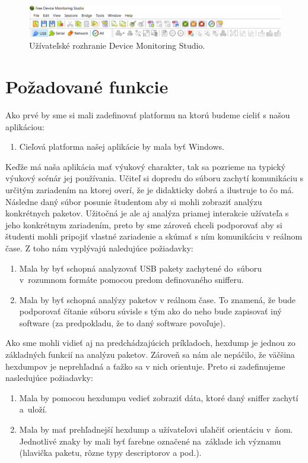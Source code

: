 \begin{figure}[!htb]
	\centering
	\includegraphics[width=\textwidth]{img/uvod_hhd_interface}
	\caption{Užívateľské rozhranie Device Monitoring Studio.}
	\label{obr:uvod:hhd_interface}
\end{figure}


\section{Požadované funkcie}

Ako prvé by sme si mali zadefinovať platformu na ktorú budeme cieliť s našou aplikáciou:
\begin{enumerate}[label=\textbf{P\arabic*}]
	\item \label{uvod:poz:platforma} Cieľová platforma našej aplikácie by mala byť Windows. 
\end{enumerate}

Keďže má naša aplikácia mať výukový charakter, tak sa pozrieme na typický výukový scénár jej používania. Učiteľ si dopredu do súboru zachytí komunikáciu s určitým zariadením na ktorej overí, že je didakticky dobrá a ilustruje to čo má. Následne daný súbor posunie študentom aby si mohli zobraziť analýzu konkrétnych paketov. Užitočná je ale aj analýza priamej interakcie užívateľa s jeho konkrétnym zariadením, preto by sme zároveň chceli podporovať aby si študenti mohli pripojiť vlastné zariadenie a skúmať s ním komunikáciu v reálnom čase. Z toho nám vyplývajú naledujúce požiadavky:
\begin{enumerate}[label=\textbf{P\arabic*},resume]
	\item \label{uvod:poz:analyza} Mala by byť schopná analyzovať USB pakety zachytené do~súboru v~rozumnom formáte pomocou predom definovaného snifferu.
	\item \label{uvod:poz:analyza_real_time} Mala by byť schopná analýzy paketov v reálnom čase. To znamená, že bude podporovať čítanie súboru súvisle s tým ako do neho bude zapisovať iný software (za predpokladu, že to daný software povoľuje).
\end{enumerate}

Ako sme mohli vidieť aj na predchádzajúcich príkladoch, hexdump je jednou zo základných funkcií na analýzu paketov. Zároveň sa nám ale nepáčilo, že väčšina hexdumpov je neprehľadná a ťažko sa v nich orientuje. Preto si zadefinujeme nasledujúce požiadavky:
\begin{enumerate}[label=\textbf{P\arabic*},resume]
	\item \label{uvod:poz:hexdump} Mala by pomocou hexdumpu vedieť zobraziť dáta, ktoré daný sniffer zachytí a~uloží.
	\item \label{uvod:poz:data_highlight} Mala by mať prehľadnejší hexdump a užívateľovi uľahčiť orientáciu v~ňom. Jednotlivé znaky by mali byť farebne označené na~základe ich významu (hlavička paketu, rôzne typy descriptorov a pod.).
\end{enumerate}


